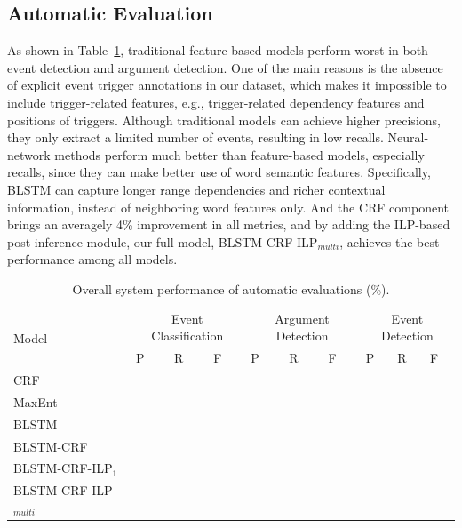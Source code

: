 \subsection{Automatic Evaluation}
As shown in Table~\ref{tab:1}, traditional feature-based models perform worst in both event detection and argument detection. 
One of the main reasons is the absence of explicit event trigger annotations in our dataset, which makes it impossible to include trigger-related features, e.g., trigger-related dependency features and positions of triggers. 
Although traditional models can achieve higher precisions, they only extract a limited number of events, resulting in low recalls. 
Neural-network methods perform much better than feature-based models, especially recalls, since they can make better use of word semantic features. Specifically, BLSTM can capture longer range dependencies and richer contextual information, instead of neighboring word features only.
And the CRF component brings an averagely 4\% improvement in all metrics, and by adding the ILP-based post inference module, our full model, BLSTM-CRF-ILP$_{multi}$, achieves the best performance among all models. 

\begin{table}[!t]
\centering
\small
\begin{tabular}{|l|p{0.8cm}<{\centering}|p{0.8cm}<{\centering}|p{0.8cm}<{\centering}|p{0.8cm}<{\centering}|p{0.8cm}<{\centering}|p{0.8cm}<{\centering}|p{0.8cm}<{\centering}|p{0.8cm}<{\centering}|p{0.8cm}<{\centering}|} \hline
	\multirow{2}{*}{Model} & \multicolumn{3}{c|}{Event Classification} & \multicolumn{3}{c|}{Argument Detection} &
	\multicolumn{3}{c|}{Event Detection} \\ \cline{2-10}
	 & P & R & F & P & R & F & P & R & F \\ \hline
	CRF &  &  &  &  &  &  &  &  &  \\ \hline
	MaxEnt &  &  &  &  &  &  &  &  &  \\ \hline
	BLSTM &  &  &  &  &  &  &  &  &   \\ \hline \hline
	BLSTM-CRF &  &  &  &  &  &  &  &  &   \\ \hline
	BLSTM-CRF-ILP$_{1}$ &  &  &  &  &  &  &  &  &  \\ \hline
	BLSTM-CRF-ILP$_{multi}$ &  &  &  &  &  &  &  &  &  \\ \hline
\end{tabular}
\caption{Overall system performance of automatic evaluations (\%).  \label{tab:1}}
\end{table}

